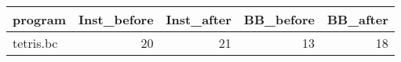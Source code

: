 \begin{tabular}{lrrrr}
\hline
 program   &   Inst\_before &   Inst\_after &   BB\_before &   BB\_after \\
\hline
 tetris.bc &            20 &           21 &          13 &         18 \\
\hline
\end{tabular}